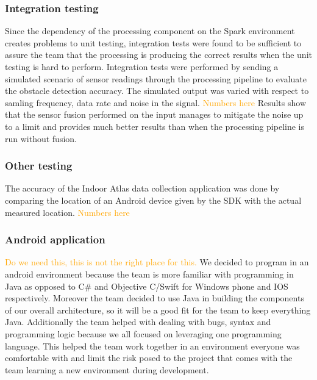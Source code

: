 \documentclass[prodmode,acmtosem]{acmsmall} %
\begin{document}
\subsubsection{Integration testing}
Since the dependency of the processing component on the Spark environment creates  problems to unit testing, integration tests were found to be sufficient to assure the team that the processing is producing the correct results when the unit testing is hard to perform. Integration tests were performed by sending a simulated scenario of sensor readings through the processing pipeline to evaluate the obstacle detection accuracy. The simulated output was varied with respect to samling frequency, data rate and noise in the signal.
\textcolor{orange}{Numbers here}
Results show that the sensor fusion performed on the input manages to mitigate the noise up to a limit and provides much better results than when the processing pipeline is run without fusion.

\subsubsection{Other testing}
The accuracy of the Indoor Atlas data collection application was done by comparing the location of an Android device given by the SDK with the actual measured location.
\textcolor{orange}{Numbers here}

\subsubsection{Android application}
\textcolor{orange}{Do we need this, this is not the right place for this.}
We decided to program in an android environment because the team is more familiar with programming in Java as opposed to C\# and Objective C/Swift for Windows phone and IOS respectively. Moreover the team decided to use Java in building the components of our overall architecture, so it will be a good fit for the team to keep everything Java. Additionally the team helped with dealing with bugs, syntax and programming logic because we all focused on leveraging one programming language. This helped the team work together in an environment everyone was comfortable with and limit the risk posed to the project that comes with the team learning a new environment during development.

\end{document}

